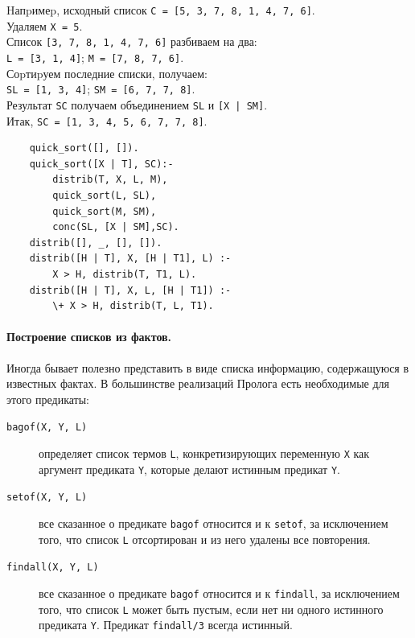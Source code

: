 \documentclass[12pt, openany, twoside]{book} %
\begin{document}
\noindent
       Hапpимеp,  исходный список {\tt С = [5, 3, 7, 8, 1, 4, 7, 6]}. \\ Удаляем {\tt Х = 5}.\\
       Список {\tt [3, 7, 8, 1, 4, 7, 6]} разбиваем на два:\\ {\tt L = [3, 1, 4]};  {\tt M = [7, 8, 7, 6]}.\\
       Соpтиpуем последние списки, получаем:\\ {\tt SL = [1, 3, 4]}; {\tt SM = [6, 7, 7, 8]}.\\
       Результат {\tt SC} получаем объединением {\tt SL} и {\tt [X | SM]}.\\
       Итак, {\tt SC = [1, 3, 4, 5, 6, 7, 7, 8]}.

{\tt\begin{verbatim}
    quick_sort([], []).
    quick_sort([X | T], SC):-
        distrib(T, X, L, M),
        quick_sort(L, SL),
        quick_sort(M, SM),
        conc(SL, [X | SM],SC).
    distrib([], _, [], []).
    distrib([H | T], X, [H | T1], L) :-
        X > H, distrib(T, T1, L).
    distrib([H | T], X, L, [H | T1]) :-
        \+ X > H, distrib(T, L, T1).
\end{verbatim}}

\paragraph{Построение списков из фактов.} Иногда бывает полезно представить в виде списка информацию, содержащуюся в известных фактах. В большинстве реализаций Пролога есть необходимые для этого предикаты:
\begin{description}
\item[\normalfont\tt bagof(X, Y, L)] определяет список термов {\tt L}, конкретизирующих переменную {\tt Х} как аргумент предиката {\tt Y}, которые делают истинным предикат {\tt Y}.

\item[\normalfont\tt setof(X, Y, L)] все сказанное о предикате {\tt bagof} относится и к {\tt setof}, за исключением того, что список {\tt L} отсортирован и из него удалены все повторения.

\item[\normalfont\tt findall(X, Y, L)] все сказанное о предикате {\tt bagof} относится и к {\tt findall}, за исключением того, что список {\tt L} может быть пустым, если нет ни одного истинного предиката {\tt Y}. Предикат {\tt findall/3} всегда истинный.
\end{description}
\end{document}
